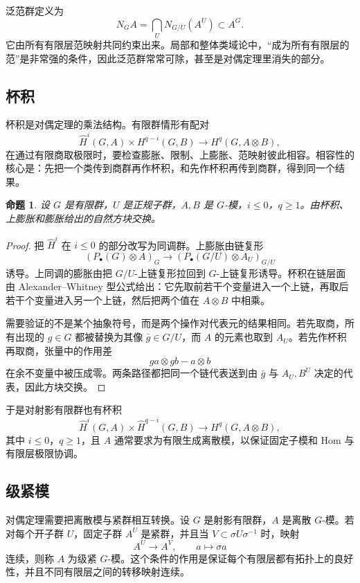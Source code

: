\documentclass[11pt,a4paper,openany]{ctexbook}
\numberwithin{equation}{chapter}
\theoremstyle{plain}
\newtheorem{proposition}[theorem]{命题}
\theoremstyle{definition}
\theoremstyle{remark}
\begin{document}
泛范群定义为
\[
N_GA=\bigcap_U N_{G/U}(A^U)\subset A^G.
\]
它由所有有限层范映射共同约束出来。局部和整体类域论中，“成为所有有限层的范”是非常强的条件，因此泛范群常常可除，甚至是对偶定理里消失的部分。

\subsection{杯积}

杯积是对偶定理的乘法结构。有限群情形有配对
\[
\widehat H^i(G,A)\times H^{q-i}(G,B)\longrightarrow H^q(G,A\otimes B),
\]
在通过有限商取极限时，要检查膨胀、限制、上膨胀、范映射彼此相容。相容性的核心是：先把一个类传到商群再作杯积，和先作杯积再传到商群，得到同一个结果。

\begin{proposition}
设 $G$ 是有限群，$U$ 是正规子群，$A,B$ 是 $G$-模，$i\leq 0$，$q\geq 1$。由杯积、上膨胀和膨胀给出的自然方块交换。
\end{proposition}

\begin{proof}
把 $\widehat H^i$ 在 $i\leq 0$ 的部分改写为同调群。上膨胀由链复形
\[
(P_\bullet(G)\otimes A)_G\longrightarrow (P_\bullet(G/U)\otimes A_U)_{G/U}
\]
诱导。上同调的膨胀由把 $G/U$-上链复形拉回到 $G$-上链复形诱导。杯积在链层面由 Alexander--Whitney 型公式给出：它先取前若干个变量进入一个上链，再取后若干个变量进入另一个上链，然后把两个值在 $A\otimes B$ 中相乘。

需要验证的不是某个抽象符号，而是两个操作对代表元的结果相同。若先取商，所有出现的 $g\in G$ 都被替换为其像 $\bar g\in G/U$，而 $A$ 的元素也取到 $A_U$。若先作杯积再取商，张量中的作用差
\[
ga\otimes gb-a\otimes b
\]
在余不变量中被压成零。两条路径都把同一个链代表送到由 $\bar g$ 与 $A_U,B^U$ 决定的代表，因此方块交换。
\end{proof}

于是对射影有限群也有杯积
\[
\widehat H^i(G,A)\times \widehat H^{q-i}(G,B)
\longrightarrow H^q(G,A\otimes B),
\]
其中 $i\leq 0$，$q\geq 1$，且 $A$ 通常要求为有限生成离散模，以保证固定子模和 Hom 与有限层极限协调。

\subsection{级紧模}

对偶定理需要把离散模与紧群相互转换。设 $G$ 是射影有限群，$A$ 是离散 $G$-模。若对每个开子群 $U$，固定子群 $A^U$ 是紧群，并且当 $V\subset \sigma U\sigma^{-1}$ 时，映射
\[
A^U\longrightarrow A^V,\qquad a\longmapsto \sigma a
\]
连续，则称 $A$ 为级紧 $G$-模。这个条件的作用是保证每个有限层都有拓扑上的良好性，并且不同有限层之间的转移映射连续。
\end{document}
